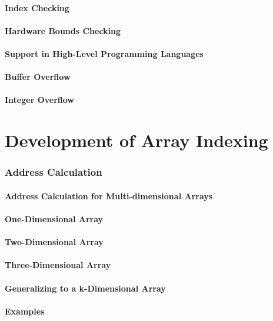 \documentclass[12pt, oneside]{book}
\begin{document}
\subsubsection{Index Checking}
\subsubsection{Hardware Bounds Checking}
\subsubsection{Support in High-Level Programming Languages}
\subsubsection{Buffer Overflow}
\subsubsection{Integer Overflow}
\chapter{Development of Array Indexing}
\subsection{Address Calculation}
\subsubsection{Address Calculation for Multi-dimensional Arrays}
\subsubsection{One-Dimensional Array}
\subsubsection{Two-Dimensional Array}
\subsubsection{Three-Dimensional Array}
\subsubsection{Generalizing to a k-Dimensional Array}
\subsubsection{Examples}
\end{document}
